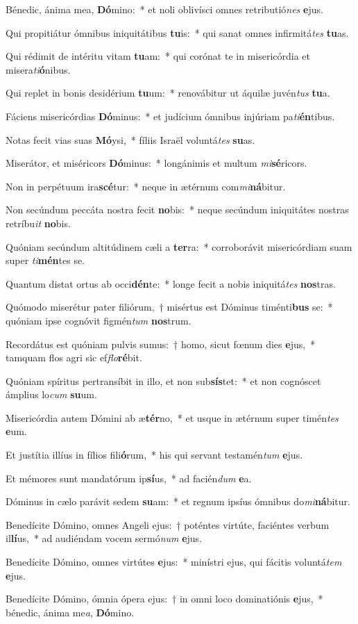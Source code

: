 \item Bénedic, ánima mea, \textbf{Dó}mino:~* et noli oblivísci omnes retributió\textit{nes} \textbf{e}jus.
\item Qui propitiátur ómnibus iniquitátibus \textbf{tu}is:~* qui sanat omnes infirmitá\textit{tes} \textbf{tu}as.
\item Qui rédimit de intéritu vitam \textbf{tu}am:~* qui corónat te in misericórdia et misera\textit{ti}\textbf{ó}nibus.
\item Qui replet in bonis desidérium \textbf{tu}um:~* renovábitur ut áquilæ juvén\textit{tus} \textbf{tu}a.
\item Fáciens misericórdias \textbf{Dó}minus:~* et judícium ómnibus injúriam pa\textit{ti}\textbf{én}tibus.
\item Notas fecit vias suas \textbf{Mó}ysi,~* fíliis Israël voluntá\textit{tes} \textbf{su}as.
\item Miserátor, et miséricors \textbf{Dó}minus:~* longánimis et multum \textit{mi}\textbf{sé}ricors.
\item Non in perpétuum ira\textbf{scé}tur:~* neque in ætérnum com\textit{mi}\textbf{ná}bitur.
\item Non secúndum peccáta nostra fecit \textbf{no}bis:~* neque secúndum iniquitátes nostras retríbu\textit{it} \textbf{no}bis.
\item Quóniam secúndum altitúdinem cæli a \textbf{ter}ra:~* corroborávit misericórdiam suam super \textit{ti}\textbf{mén}tes se.
\item Quantum distat ortus ab occi\textbf{dén}te:~* longe fecit a nobis iniquitá\textit{tes} \textbf{nos}tras.
\item Quómodo miserétur pater filiórum,~† misértus est Dóminus timénti\textbf{bus} se:~* quóniam ipse cognóvit figmén\textit{tum} \textbf{nos}trum.
\item Recordátus est quóniam pulvis sumus:~† homo, sicut fœnum dies \textbf{e}jus,~* tamquam flos agri sic ef\textit{flo}\textbf{ré}bit.
\item Quóniam spíritus pertransíbit in illo, et non sub\textbf{sís}tet:~* et non cognóscet ámplius lo\textit{cum} \textbf{su}um.
\item Misericórdia autem Dómini ab æ\textbf{tér}no,~* et usque in ætérnum super timén\textit{tes} \textbf{e}um.
\item Et justítia illíus in fílios fili\textbf{ó}rum,~* his qui servant testamén\textit{tum} \textbf{e}jus.
\item Et mémores sunt mandatórum ip\textbf{sí}us,~* ad facién\textit{dum} \textbf{e}a.
\item Dóminus in cælo parávit sedem \textbf{su}am:~* et regnum ipsíus ómnibus do\textit{mi}\textbf{ná}bitur.
\item Benedícite Dómino, omnes Angeli ejus:~† poténtes virtúte, faciéntes verbum il\textbf{lí}us,~* ad audiéndam vocem sermó\textit{num} \textbf{e}jus.
\item Benedícite Dómino, omnes virtútes \textbf{e}jus:~* minístri ejus, qui fácitis voluntá\textit{tem} \textbf{e}jus.
\item Benedícite Dómino, ómnia ópera ejus:~† in omni loco dominatiónis \textbf{e}jus,~* bénedic, ánima me\textit{a}, \textbf{Dó}mino.
